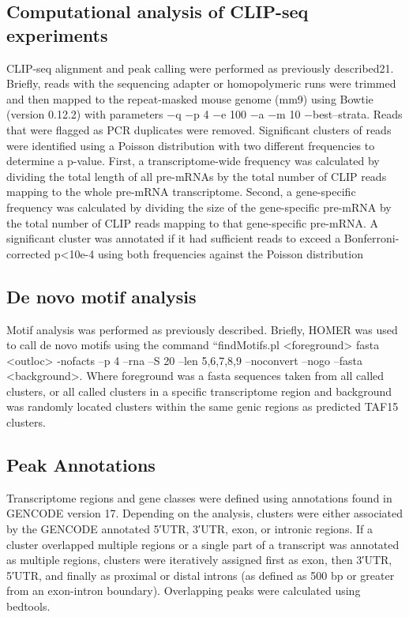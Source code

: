 \subsection{Computational analysis of CLIP-seq experiments}
CLIP-seq alignment and peak calling were performed as previously described21. Briefly, reads with the sequencing adapter or homopolymeric runs were trimmed and then mapped to the repeat-masked mouse genome (mm9) using Bowtie (version 0.12.2) with parameters −q −p 4 −e 100 −a −m 10 −best–strata. Reads that were flagged as PCR duplicates were removed. Significant clusters of reads were identified using a Poisson distribution with two different frequencies to determine a p-value.  First, a transcriptome-wide frequency was calculated by dividing the total length of all pre-mRNAs by the total number of CLIP reads mapping to the whole pre-mRNA transcriptome. Second, a gene-specific frequency was calculated by dividing the size of the gene-specific pre-mRNA by the total number of CLIP reads mapping to that gene-specific pre-mRNA. A significant cluster was annotated if it had sufficient reads to exceed a Bonferroni-corrected p<10e-4 using both frequencies against the Poisson distribution

\subsection{De novo motif analysis}
Motif analysis was performed as previously described\cite{Lovci2013}. Briefly, HOMER\cite{Heinz2010} was used to call de novo motifs using the command “findMotifs.pl <foreground> fasta <outloc> -nofacts –p 4 –rna –S 20 –len 5,6,7,8,9 –noconvert –nogo –fasta <background>.  Where foreground was a fasta sequences taken from all called clusters, or all called clusters in a specific transcriptome region and background was  randomly located clusters within the same genic regions as predicted TAF15 clusters.

\subsection{Peak Annotations}
Transcriptome regions and gene classes were defined using annotations found in GENCODE version 17\cite{Harrow2012}. Depending on the analysis, clusters were either associated by the GENCODE annotated 5′UTR, 3′UTR, exon, or intronic regions. If a cluster overlapped multiple regions or a single part of a transcript was annotated as multiple regions, clusters were iteratively assigned first as exon, then 3′UTR, 5′UTR, and finally as proximal or distal introns (as defined as 500 bp or greater from an exon-intron boundary). Overlapping peaks were calculated using bedtools\cite{Quinlan2010,Dale2011a}.

